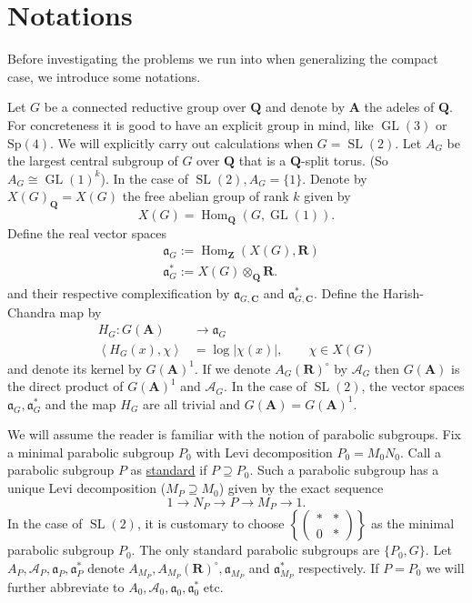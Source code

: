 \documentclass[11pt]{amsart}
\def\A{\mathbf A}
\def\C{\mathbf C}
\def\Q{\mathbf Q}
\def\R{\mathbf R}
\def\Z{\mathbf Z}
\def\AAA{\mathcal A}	%
\def\aaa{\mathfrak a}
\def\cb#1{{\color{blue}#1}}
\def\gl{\operatorname{GL}}
\def\hom{\operatorname{Hom}}
\def\mod#1{\lvert #1 \rvert} %
\def\sl{\operatorname{SL}}
\def\sprod#1#2{\left\langle #1 , #2 \right\rangle}  %
\theoremstyle{remark}
\begin{document}
\section{Notations} \label{sec_not1}

Before investigating the problems we run into when generalizing the compact case, we introduce some notations. 

Let $G$ be a connected reductive group over $\Q$ and denote by $\A$ the adeles of $\Q$. For concreteness it is good to have an explicit group in mind, like $\gl(3)$ or $\text{Sp}(4)$. \cb{We will explicitly carry out calculations when $G = \sl(2)$.} Let $A_G$ be the largest central subgroup of $G$ over $\Q$ that is a $\Q$-split torus. (So $A_G \cong \gl(1)^k$). \cb{In the case of $\sl(2), A_G = \{1\}$.} Denote by $X(G)_\Q = X(G)$ the free abelian group of rank $k$ given by
\[ X(G) = \hom_\Q(G, \gl(1)). \]
Define the real vector spaces
\begin{align*}
	& \aaa_G := \hom_\Z(X(G), \R) \\
	& \aaa_G^* := X(G) \otimes_\Q \R.
\end{align*}
and their respective complexification by $\aaa_{G, \C}$ and $\aaa_{G, \C}^*$. 
Define the Harish-Chandra map by
\begin{align*}
	H_G : G(\A) & \to \aaa_G \\
	\sprod{H_G(x)}{\chi} & = \log \mod{\chi(x)}, \qquad \chi \in X(G)
\end{align*}
and denote its kernel by $G(\A)^1$. If we denote $A_G(\R)^\circ$ by $\AAA_G$ then $G(\A)$ is the direct product of $G(\A)^1$ and $\AAA_G$. \cb{In the case of $\sl(2)$, the vector spaces $\aaa_G, \aaa_G^*$ and the map $H_G$ are all trivial and $G(\A) = G(\A)^1$.}

We will assume the reader is familiar with the notion of parabolic subgroups. Fix a minimal parabolic subgroup $P_0$ with Levi decomposition $P_0 = M_0 N_0$. Call a parabolic subgroup $P$ as \underline{standard} if $P \supseteq P_0$.  Such a parabolic subgroup has a unique Levi decomposition ($M_P \supseteq M_0$) given by the exact sequence
\[ 1 \to N_P \to P \to M_P \to 1. \]
\cb{ In the case of $\sl(2)$, it is customary to choose $\left\{\begin{pmatrix} * & * \\ 0 & * \end{pmatrix}\right\}$ as the minimal parabolic subgroup $P_0$. The only standard parabolic subgroups are $\{P_0, G\}$. }
Let $A_P, \AAA_P, \aaa_P, \aaa_P^*$ denote $A_{M_P}, A_{M_P}(\R)^\circ, \aaa_{M_P}$ and $\aaa_{M_P}^*$ respectively. If $P = P_0$ we will further abbreviate to $A_0, \AAA_0, \aaa_0, \aaa_0^*$ etc. 
\end{document}

